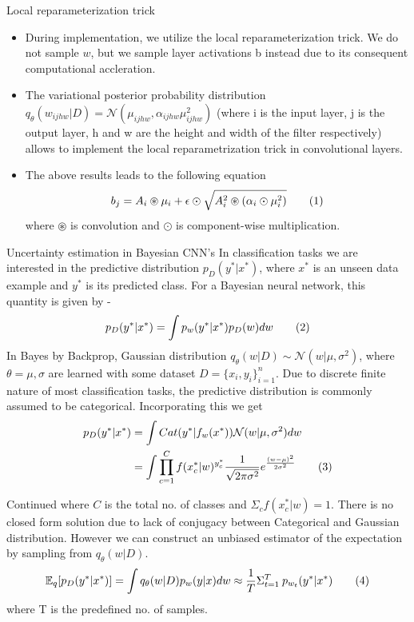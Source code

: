 \documentclass{beamer}
\theoremstyle{remark}
\newcommand\numberthis{\addtocounter{equation}{1}\tag{\theequation}}
\begin{document}
\begin{frame}{Local reparameterization trick}
    \begin{itemize}
        \item During implementation, we utilize the local reparameterization trick. We do not sample $w$, but we sample layer activations b instead due to its consequent computational accleration.
        \item The variational posterior probability distribution $q_\theta(w_{ijhw}|D)=\mathcal{N}(\mu_{ijhw},\alpha_{ijhw}\mu^2_{ijhw})$ (where i is the input layer, j is the output layer, h and w are the height and width of the filter respectively) allows to implement the local reparametrization trick in convolutional layers.
        \item The above results leads to the following equation 
        \begin{align*}
            b_j = A_i \circledast \mu_i + \epsilon \odot \sqrt{A_i^2 \circledast (\alpha_i \odot \mu_i^2)} \numberthis{\label{eq4}} 
        \end{align*}
        where $\circledast$ is convolution and $\odot$ is component-wise multiplication.
    \end{itemize}
\end{frame}
\begin{frame}{Uncertainty estimation in Bayesian CNN's}
    In classification tasks we are interested in the predictive distribution $p_D(y^*|x^*)$, where $x^*$ is an unseen data example and $y^*$ is its predicted class. For a Bayesian neural network, this quantity is given by - \begin{align*}
        p_D(y^*|x^*) = \int p_w (y^*|x^*) p_D(w) dw \numberthis{\label{eq5}}
    \end{align*}
    In Bayes by Backprop, Gaussian distribution $q_\theta(w|D)\sim \mathcal{N}(w|\mu,\sigma^2)$, where $\theta={\mu,\sigma}$ are learned with some dataset $D=\{x_i,y_i\}_{i=1}^{n}$. Due to discrete finite nature of most classification tasks, the predictive distribution is commonly assumed to be categorical. Incorporating this we get 
    \begin{align*}
        p_D(y^*|x^*) &= \int Cat(y^*|f_w(x^*))\mathcal{N}(w|\mu,\sigma^2) dw\\
        &=\int \prod_{c=1}^C f(x_c^*|w)^{y_c^*} \frac{1}{\sqrt{2\pi\sigma^2}}e^{\frac{(w-\mu)^2}{2\sigma^2}} \numberthis{\label{eq6}}
    \end{align*}
\end{frame}
\begin{frame}{Continued}
    where $C$ is the total no. of classes and $\Sigma_c f(x_c^*|w)=1$.
    There is no closed form solution due to lack of conjugacy between Categorical and Gaussian distribution. However we can construct an unbiased estimator of the expectation by sampling from $q_\theta(w|D)$.
    \begin{align*}
        \mathbb{E}_q[p_D(y^*|x^*)] = \int q_\theta (w|D) p_w(y|x) dw \approx \frac{1}{T} \Sigma_{t=1}^T\: p_{w_t}(y^*|x^*) \numberthis{\label{eq7}}
    \end{align*}
    where T is the predefined no. of samples.
\end{frame}
\end{document}
